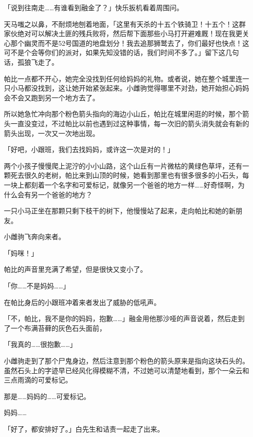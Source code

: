 「说到往南走……有谁看到融金了？」快乐扳机看着周围问。

天马嗤之以鼻，不耐烦地刨着地面，「这里有天杀的十五个铁骑卫！十五个！这群家伙绝对可以解决土匪的残兵败将，然后帮下面那些小马打开避难厩！现在我更关心那个幽灵而不是52号国道的地盘划分！我去追那狮鹫去了，你们最好也快点！这可不是个会等你们的派对，如果先知没错的话，我们时间不多了。」留下这几句话，孤狼飞走了。

\horizonline


帕比一点都不开心，她完全没找到任何给妈妈的礼物。或者说，她在整个城里连一只小马都没找到，这让她开始紧张起来。小雌驹觉得哪里不对劲，她开始担心妈妈会不会又跑到另一个地方去了。

所以她急忙冲向那个粉色箭头指向的海边小山丘，帕比在城里闲逛的时候，那个箭头一直没变过，不过帕比以前也遇到过这种事情，每一次旧的箭头消失就会有新的箭头出现，一次又一次地出现。

「好吧，小跟班，我们去找妈妈，或许这一次是对的！」

两个小孩子慢慢爬上泥泞的小小山路，这个山丘有一片微枯的黄绿色草坪，还有一颗死去很久的老树，帕比来到山顶的时候，她看到那里也有很多很多的小石头，每一块上都刻着一个名字和可爱标记，就像另一个爸爸的地方一样……好奇怪啊，为什么会有另一个爸爸的地方？

一只小马正坐在那颗只剩下枝干的树下，他慢慢站了起来，走向帕比和她的新朋友。

小雌驹飞奔向来者。

「妈咪！」

帕比的声音里充满了希望，但是很快又变小了。

「你……不是妈妈……」

在帕比身后的小跟班冲着来者发出了威胁的低吼声。

「不，帕比，我不是你的妈妈，抱歉……」融金用他那沙哑的声音说着，然后走到了一个布满苔藓的灰色石头面前，

「我真的……很抱歉……」

小雌驹走到了那个尸鬼身边，然后注意到那个粉色的箭头原来是指向这块石头的。虽然石头上的字迹早已经风化得模糊不清，不过她可以清楚地看到，那个一朵云和三点雨滴的可爱标记。

那是……妈妈的……可爱标记。

妈妈……{}

\horizonline


「好了，都安排好了。」白先生和诘责一起走了出来。

